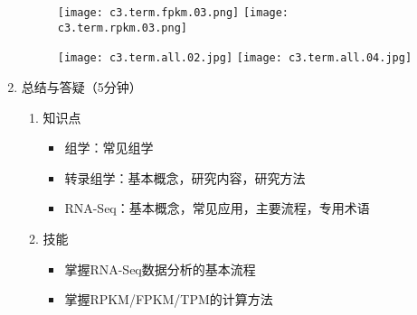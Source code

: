 \documentclass{TIJMUjiaoanLL}
\begin{document}
\begin{enumerate}
\otherTail
\newpage
\otherHeader

        \vspace{-1em}
        \begin{figure}[h]
          \centering
          \texttt{[image: c3.term.fpkm.03.png]}
          \texttt{[image: c3.term.rpkm.03.png]}
        \end{figure}
        \vspace{-1em}
        \begin{figure}[h]
          \centering
          \texttt{[image: c3.term.all.02.jpg]}
          \texttt{[image: c3.term.all.04.jpg]}
        \end{figure}
        \vspace{-1em}

  \item 总结与答疑（5分钟）
    \begin{enumerate}
      \item 知识点
	\begin{itemize}
	  \item 组学：常见组学
	  \item 转录组学：基本概念，研究内容，研究方法
    \item RNA-Seq：基本概念，常见应用，主要流程，专用术语
	\end{itemize}
      \item 技能
	\begin{itemize}
    \item 掌握RNA-Seq数据分析的基本流程
    \item 掌握RPKM/FPKM/TPM的计算方法
	\end{itemize}
    \end{enumerate}
\end{enumerate}

\otherTail
\end{document}
